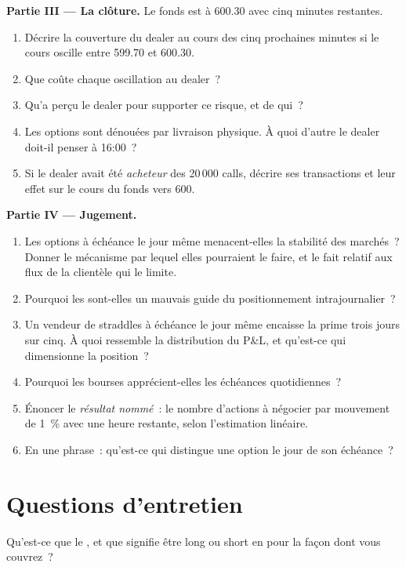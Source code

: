 \begin{problem}
\medskip\noindent\textbf{Partie III --- La clôture.}
Le fonds est à 600.30 avec cinq minutes restantes.
\begin{enumerate}[resume]
\item Décrire la couverture du dealer au cours des cinq prochaines minutes si le cours oscille
entre 599.70 et 600.30.
\item Que coûte chaque oscillation au dealer~?
\item Qu'a perçu le dealer pour supporter ce risque, et de qui~?
\item Les options sont dénouées par livraison physique. À quoi d'autre le dealer doit-il
penser à 16:00~?
\item Si le dealer avait été \emph{acheteur} des 20\,000 calls, décrire ses transactions
et leur effet sur le cours du fonds vers 600.
\end{enumerate}

\medskip\noindent\textbf{Partie IV --- Jugement.}
\begin{enumerate}[resume]
\item Les options à échéance le jour même menacent-elles la stabilité des marchés~? Donner le mécanisme
par lequel elles pourraient le faire, et le fait relatif aux flux de la clientèle qui le limite.
\item Pourquoi les  sont-elles un mauvais guide du positionnement intrajournalier~?
\item Un vendeur de straddles à échéance le jour même encaisse la prime trois jours sur
cinq. À quoi ressemble la distribution du P\&L, et qu'est-ce qui dimensionne la
position~?
\item Pourquoi les bourses apprécient-elles les échéances quotidiennes~?
\item Énoncer le \emph{résultat nommé}~: le nombre d'actions à négocier par mouvement de 1~\% avec
une heure restante, selon l'estimation linéaire.
\item En une phrase~: qu'est-ce qui distingue une option le jour de son échéance~?
\end{enumerate}
\end{problem}

\section{Questions d'entretien}

\begin{interviewq}\label{iq:m1:zero-day-options-and-retail-flow:1}
Qu'est-ce que le , et que signifie être long ou short en  pour
la façon dont vous couvrez~?
\end{interviewq}

